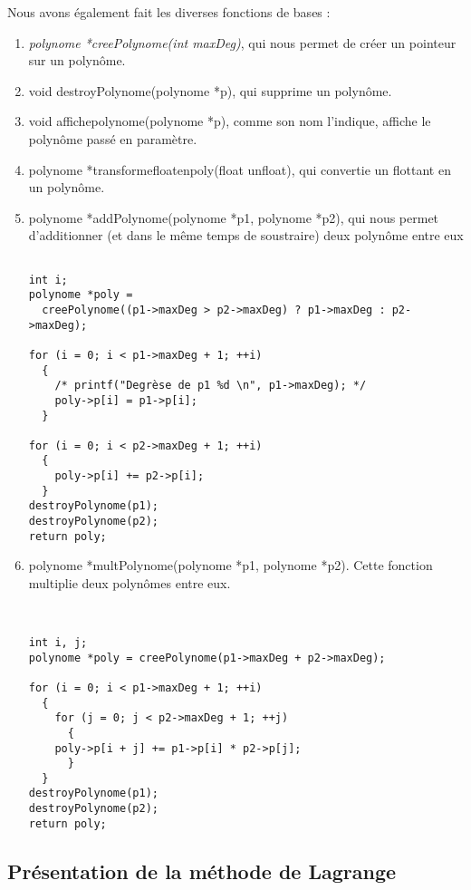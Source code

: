 \documentclass[letter]{article}
\begin{document}
Nous avons également fait les diverses fonctions de bases :
\begin{enumerate}
\item \emph{polynome *creePolynome(int maxDeg)}, qui nous permet de créer un pointeur sur un polynôme.
\item void destroyPolynome(polynome *p), qui supprime un polynôme.
\item void affichepolynome(polynome *p), comme son nom l'indique, affiche le polynôme passé en paramètre.
\item polynome *transformefloatenpoly(float unfloat), qui convertie un flottant en un polynôme.
\item polynome *addPolynome(polynome *p1, polynome *p2), qui nous permet d'additionner (et dans le même temps de soustraire) deux polynôme entre eux

\begin{verbatim}

int i;
polynome *poly =
  creePolynome((p1->maxDeg > p2->maxDeg) ? p1->maxDeg : p2->maxDeg);

for (i = 0; i < p1->maxDeg + 1; ++i)
  {
    /* printf("Degrèse de p1 %d \n", p1->maxDeg); */
    poly->p[i] = p1->p[i];
  }

for (i = 0; i < p2->maxDeg + 1; ++i)
  {
    poly->p[i] += p2->p[i];
  }
destroyPolynome(p1);
destroyPolynome(p2);
return poly;

\end{verbatim}
\item polynome *multPolynome(polynome *p1, polynome *p2). Cette fonction multiplie deux polynômes entre eux.

\begin{verbatim}


int i, j;
polynome *poly = creePolynome(p1->maxDeg + p2->maxDeg);

for (i = 0; i < p1->maxDeg + 1; ++i)
  {
    for (j = 0; j < p2->maxDeg + 1; ++j)
      {
	poly->p[i + j] += p1->p[i] * p2->p[j];
      }
  }
destroyPolynome(p1);
destroyPolynome(p2);
return poly;

\end{verbatim}
\end{enumerate}






\subsection{Présentation de la méthode de Lagrange}
\label{sec:org2c7380b}
\end{document}
